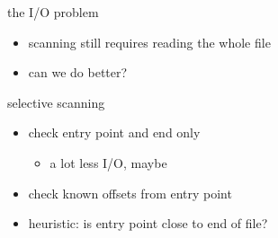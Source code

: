 
\begin{frame}{the I/O problem}
    \begin{itemize}
    \item scanning still requires reading the whole file
    \item can we do better?
    \end{itemize}
\end{frame}

\begin{frame}{selective scanning}
    \begin{itemize}
    \item check entry point and end only
        \begin{itemize}
        \item a lot less I/O, maybe
        \end{itemize}
    \item check known offsets from entry point
    \item heuristic: is entry point close to end of file?
    \end{itemize}
\end{frame}

